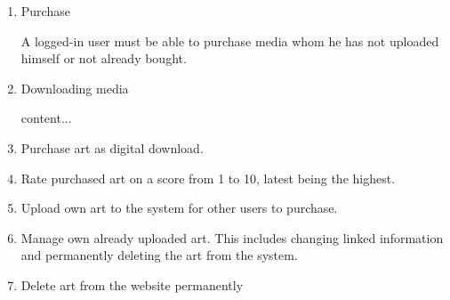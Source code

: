 \documentclass[../report.tex]{subfiles}
\begin{document}
\begin{enumerate}
		\item Purchase
			\begin{enumerate}
				A logged-in user must be able to purchase media whom he has not uploaded himself or not already bought.
			\end{enumerate}

		\item Downloading media
			\begin{enumerate}
			content...
			\end{enumerate}

		\item Purchase art as digital download.
		\item Rate purchased art on a score from 1 to 10, latest being the highest.
		\item Upload own art to the system for other users to purchase.
		\item Manage own already uploaded art. This includes changing linked information and permanently deleting the art from the system.




	\item Delete art from the website permanently

\end{enumerate}	
\end{document}
